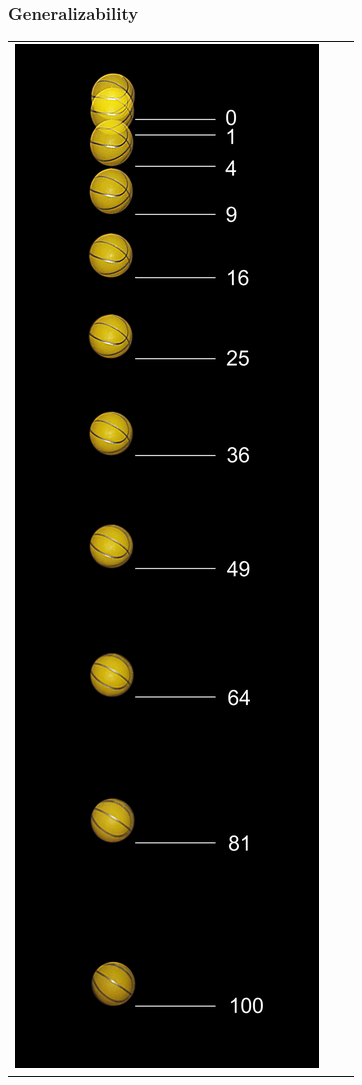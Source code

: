 \documentclass{beamer}
\begin{document}
\begin{frame}
\frametitle{Generalizability}
\begin{center}
\begin{tabular}{ccc}
\includegraphics[scale = 0.1]{Falling_ball.jpg} &

\end{tabular}
\end{center}
\end{frame}
\end{document}
